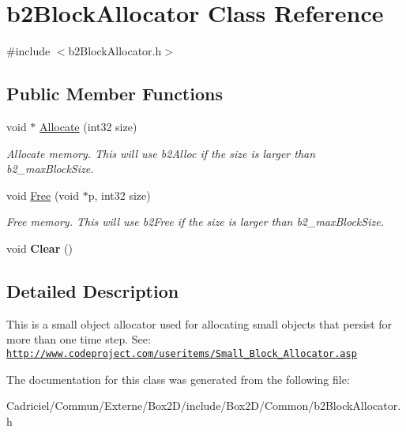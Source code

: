 \hypertarget{classb2_block_allocator}{}\section{b2\+Block\+Allocator Class Reference}
\label{classb2_block_allocator}


{\ttfamily \#include $<$b2\+Block\+Allocator.\+h$>$}

\subsection*{Public Member Functions}
\begin{DoxyCompactItemize}
\item 
void $\ast$ \hyperlink{classb2_block_allocator_a60b4b07a234adfe19cd1279805ed6519}{Allocate} (int32 size)\hypertarget{classb2_block_allocator_a60b4b07a234adfe19cd1279805ed6519}{}\label{classb2_block_allocator_a60b4b07a234adfe19cd1279805ed6519}

\begin{DoxyCompactList}\small\item\em Allocate memory. This will use b2\+Alloc if the size is larger than b2\+\_\+max\+Block\+Size. \end{DoxyCompactList}\item 
void \hyperlink{classb2_block_allocator_a945fdf86e260318b930a53dcc887ca8b}{Free} (void $\ast$p, int32 size)\hypertarget{classb2_block_allocator_a945fdf86e260318b930a53dcc887ca8b}{}\label{classb2_block_allocator_a945fdf86e260318b930a53dcc887ca8b}

\begin{DoxyCompactList}\small\item\em Free memory. This will use b2\+Free if the size is larger than b2\+\_\+max\+Block\+Size. \end{DoxyCompactList}\item 
void {\bfseries Clear} ()\hypertarget{classb2_block_allocator_a3d3bac86217eba9d1eb6dff2acee0d77}{}\label{classb2_block_allocator_a3d3bac86217eba9d1eb6dff2acee0d77}

\end{DoxyCompactItemize}


\subsection{Detailed Description}
This is a small object allocator used for allocating small objects that persist for more than one time step. See\+: \href{http://www.codeproject.com/useritems/Small_Block_Allocator.asp}{\tt http\+://www.\+codeproject.\+com/useritems/\+Small\+\_\+\+Block\+\_\+\+Allocator.\+asp} 

The documentation for this class was generated from the following file\+:\begin{DoxyCompactItemize}
\item 
Cadriciel/\+Commun/\+Externe/\+Box2\+D/include/\+Box2\+D/\+Common/b2\+Block\+Allocator.\+h\end{DoxyCompactItemize}

